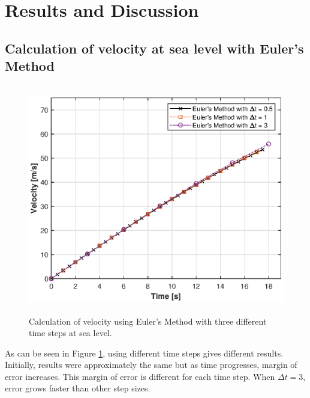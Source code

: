 \documentclass[letterpaper,12pt]{article}
\begin{document}
\newpage

\section{Results and Discussion}

\subsection{Calculation of velocity at sea level with Euler's Method }
\begin{figure}[ht]
\centering \includegraphics[max height=10cm]{graphs/question1.eps}
\caption{Calculation of velocity using Euler's Method with three different time steps at sea level.}
     \label{fig:q1}
\end{figure}

As can be seen in Figure \ref{fig:q1}, using different time steps gives different results.
Initially, results were approximately the same but as time progresses, margin of error increases.
This margin of error is different for each time step. When $ \Delta t = 3 $, error grows faster than
other step sizes.
\end{document}
